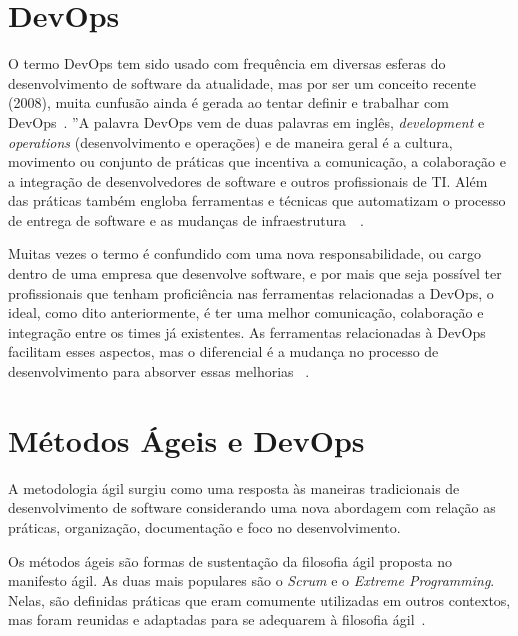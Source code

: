 \section{DevOps}
\label{sec:devops}

O termo DevOps tem sido usado com frequência em diversas esferas do
desenvolvimento de software da atualidade, mas por ser um conceito recente
(2008), muita cunfusão ainda é gerada ao tentar definir e trabalhar com
DevOps~\cite{adambertram:2016}. ''A palavra DevOps vem de duas palavras em
inglês, \textit{development} e \textit{operations} (desenvolvimento e operações) e de maneira
geral é a cultura, movimento ou conjunto de práticas que incentiva
a comunicação, a colaboração e a integração de desenvolvedores de software
e outros profissionais de TI. Além das práticas também engloba ferramentas
e técnicas que automatizam o processo de entrega de software e as mudanças
de infraestrutura~\cite{loukides2012devops}~\cite{erich2014mapping}.

Muitas vezes o termo é confundido com uma nova responsabilidade, ou cargo
dentro de uma empresa que desenvolve software, e por mais que seja possível
ter profissionais que tenham proficiência nas ferramentas relacionadas a
DevOps, o ideal, como dito anteriormente, é ter uma melhor comunicação,
colaboração e integração entre os times já existentes. As ferramentas
relacionadas à DevOps facilitam esses aspectos, mas o diferencial é a
mudança no processo de desenvolvimento para absorver essas melhorias
~\cite{adambertram:2016}.


\section{Métodos Ágeis e DevOps}
\label{sec:agile-devops}

A metodologia ágil surgiu como uma resposta às maneiras tradicionais de desenvolvimento
de software considerando uma nova abordagem com relação as práticas, organização,
documentação e foco no desenvolvimento.~\cite{agilemetorg:2016}

Os métodos ágeis são formas de sustentação da filosofia ágil proposta no manifesto
ágil\cite{fowler:2001}. As duas mais populares são o \textit{Scrum} e o \textit{Extreme Programming}. Nelas,
são definidas práticas que eram comumente utilizadas em outros contextos,
mas foram reunidas e adaptadas para se adequarem à filosofia ágil~\cite{shore:2007}.

